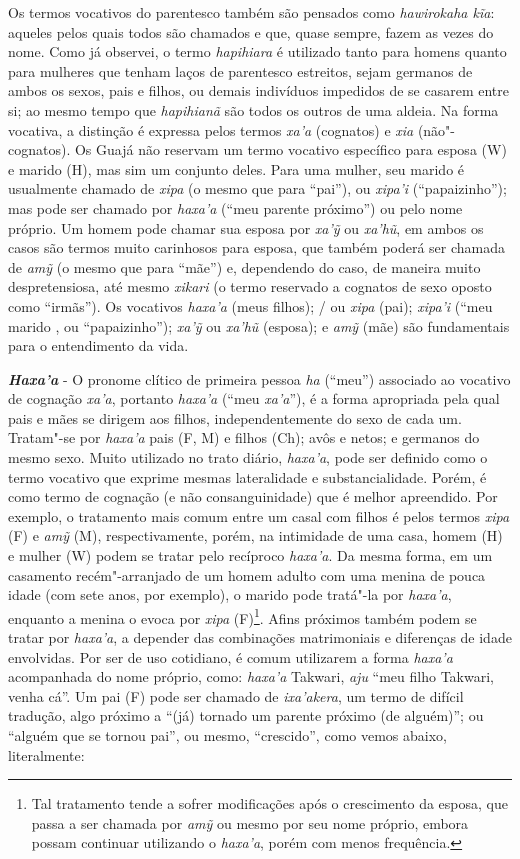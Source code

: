 Os termos vocativos do parentesco também são pensados como
\emph{hawirokaha kĩa}: aqueles pelos quais todos são chamados e que,
quase sempre, fazem as vezes do nome. Como já observei, o termo
\emph{hapihiara} é utilizado tanto para homens quanto para mulheres que
tenham laços de parentesco estreitos, sejam germanos de ambos os sexos,
pais e filhos, ou demais indivíduos impedidos de se casarem entre si; ao
mesmo tempo que \emph{hapihianã} são todos os outros de uma aldeia. Na
forma vocativa, a distinção é expressa pelos termos \emph{xa'a}
(cognatos) e \emph{xia} (não"-cognatos). Os Guajá não reservam um termo
vocativo específico para esposa (W) e marido (H), mas sim um conjunto
deles. Para uma mulher, seu marido é usualmente chamado de \emph{xipa}
(o mesmo que para ``pai''), ou \emph{xipa'i} (``papaizinho''); mas pode
ser chamado por \emph{haxa'a} (``meu parente próximo'') ou pelo nome
próprio. Um homem pode chamar sua esposa por \emph{xa'ỹ} ou
\emph{xa'hũ}, em ambos os casos são termos muito carinhosos para esposa,
que também poderá ser chamada de \emph{amỹ} (o mesmo que para ``mãe'') e,
dependendo do caso, de maneira muito despretensiosa, até mesmo
\emph{xikari} (o termo reservado a cognatos de sexo oposto como
``irmãs''). Os vocativos \emph{haxa'a} (meus filhos); / ou \emph{xipa}
(pai); \emph{xipa'i} (``meu marido , ou ``papaizinho''); \emph{xa'ỹ} ou
\emph{xa'hũ} (esposa); e \emph{amỹ} (mãe) são fundamentais para o
entendimento da vida.

\textbf{\emph{Haxa'a}} - O pronome clítico de primeira pessoa \emph{ha}
(``meu'') associado ao vocativo de cognação \emph{xa'a}, portanto
\emph{haxa'a} (``meu \emph{xa'a}''), é a forma apropriada pela qual pais e
mães se dirigem aos filhos, independentemente do sexo de cada um.
Tratam"-se por \emph{haxa'a} pais (F, M) e filhos (Ch); avôs e netos; e
germanos do mesmo sexo. Muito utilizado no trato diário, \emph{haxa'a},
pode ser definido como o termo vocativo que exprime mesmas lateralidade
e substancialidade. Porém, é como termo de cognação (e não
consanguinidade) que é melhor apreendido. Por exemplo, o tratamento mais
comum entre um casal com filhos é pelos termos \emph{xipa} (F) e
\emph{amỹ} (M), respectivamente, porém, na intimidade de uma casa, homem
(H) e mulher (W) podem se tratar pelo recíproco \emph{haxa'a}. Da mesma
forma, em um casamento recém"-arranjado de um homem adulto com uma menina
de pouca idade (com sete anos, por exemplo), o marido pode tratá"-la por
\emph{haxa'a}, enquanto a menina o evoca por \emph{xipa} (F)\footnote{Tal
  tratamento tende a sofrer modificações após o crescimento da esposa,
  que passa a ser chamada por \emph{amỹ} ou mesmo por seu nome próprio,
  embora possam continuar utilizando o \emph{haxa'a}, porém com menos
  frequência.}. Afins próximos também podem se tratar por \emph{haxa'a},
a depender das combinações matrimoniais e diferenças de idade
envolvidas. Por ser de uso cotidiano, é comum utilizarem a forma
\emph{haxa'a} acompanhada do nome próprio, como: \emph{haxa'a} Takwari,
\emph{aju} ``meu filho Takwari, venha cá''. Um pai (F) pode ser chamado de
\emph{ixa'akera}, um termo de difícil tradução, algo próximo a ``(já)
tornado um parente próximo (de alguém)''; ou ``alguém que se tornou pai'',
ou mesmo, ``crescido'', como vemos abaixo, literalmente:

